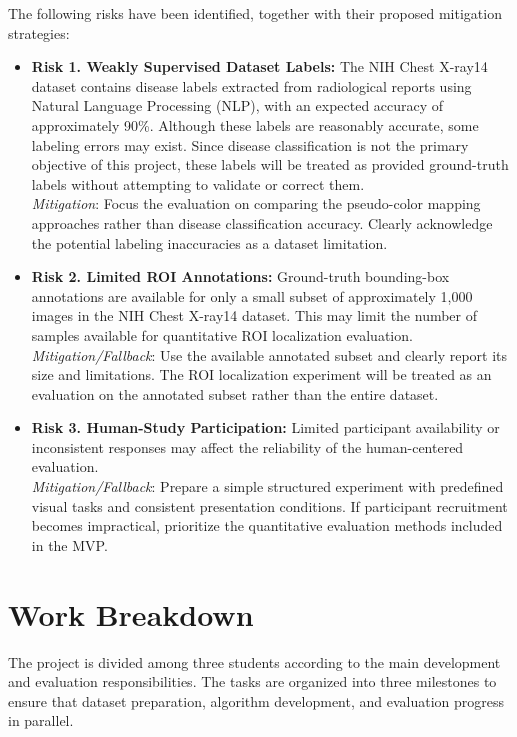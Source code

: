 \documentclass[11pt]{article}
\begin{document}
The following risks have been identified, together with their proposed mitigation strategies:
\begin{itemize}[leftmargin=*]

    \item \textbf{Risk 1. Weakly Supervised Dataset Labels:} The NIH Chest X-ray14 dataset contains disease labels extracted from radiological reports using Natural Language Processing (NLP), with an expected accuracy of approximately 90\%. Although these labels are reasonably accurate, some labeling errors may exist. Since disease classification is not the primary objective of this project, these labels will be treated as provided ground-truth labels without attempting to validate or correct them.\\ 
    \textit{Mitigation}: Focus the evaluation on comparing the pseudo-color mapping approaches rather than disease classification accuracy. Clearly acknowledge the potential labeling inaccuracies as a dataset limitation.

    \item \textbf{Risk 2. Limited ROI Annotations:} Ground-truth bounding-box annotations are available for only a small subset of approximately 1,000 images in the NIH Chest X-ray14 dataset. This may limit the number of samples available for quantitative ROI localization evaluation.\\ 
    \textit{Mitigation/Fallback}: Use the available annotated subset and clearly report its size and limitations. The ROI localization experiment will be treated as an evaluation on the annotated subset rather than the entire dataset.

    \item \textbf{Risk 3. Human-Study Participation:} Limited participant availability or inconsistent responses may affect the reliability of the human-centered evaluation.\\ 
    \textit{Mitigation/Fallback}: Prepare a simple structured experiment with predefined visual tasks and consistent presentation conditions. If participant recruitment becomes impractical, prioritize the quantitative evaluation methods included in the MVP.

\end{itemize}


\section{Work Breakdown}
The project is divided among three students according to the main development and evaluation responsibilities. The tasks are organized into three milestones to ensure that dataset preparation, algorithm development, and evaluation progress in parallel. 
\label{sec:workbreakdown}
\end{document}
